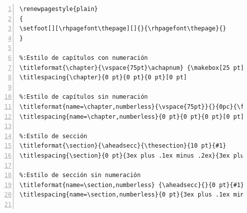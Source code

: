 \begin{lstlisting}[frame=none, numbers=left, xleftmargin=2.5em]
\renewpagestyle{plain}
{
\setfoot[][\rhpagefont\thepage][]{}{\rhpagefont\thepage}{}
}
          
%:Estilo de capítulos con numeración
\titleformat{\chapter}{\vspace{75pt}\achapnum} {\makebox[25 pt]{\raggedright\thechapter}}{8pt}{\hspace*{-6pt}\raggedright\achaptext #1}[\vspace{0.3pc} {\color{gray!75}\titlerule[3.5pt]} \vspace{50pt}]
\titlespacing{\chapter}{0 pt}{0 pt}{0 pt}[0 pt]

%:Estilo de capítulos sin numeración
\titleformat{name=\chapter,numberless}{\vspace{75pt}}{}{0pc}{\filleft\achaptext #1}[\vspace{0.3pc} {\color{gray!75}\titlerule[3.5pt]} \vspace{50pt}]
\titlespacing{name=\chapter,numberless}{0 pt}{0 pt}{0 pt}[0 pt]

%:Estilo de sección     
\titleformat{\section}{\aheadsecc}{\thesection}{10 pt}{#1} 
\titlespacing{\section}{0 pt}{3ex plus .1ex minus .2ex}{3ex plus .1ex minus .2ex}

%:Estilo de sección sin numeración     
\titleformat{name=\section,numberless} {\aheadsecc}{}{0 pt}{#1} 
\titlespacing{name=\section,numberless}{0 pt}{3ex plus .1ex minus .2ex}{3ex plus .1ex minus .2ex}


\end{lstlisting}
